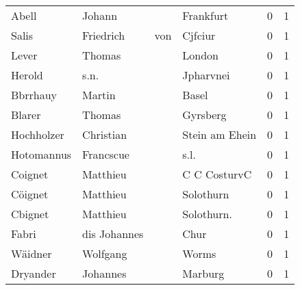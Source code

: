 \documentclass[10pt,a4paper,landscape]{article}
\begin{document}
\begin{longtable}{llllrr}
                    Abell &                             Johann &             &                                   Frankfurt &          0 &         1 \\
                    Salis &                          Friedrich &         von &                                     Cjfciur &          0 &         1 \\
                    Lever &                             Thomas &             &                                      London &          0 &         1 \\
                   Herold &                               s.n. &             &                                   Jpharvnei &          0 &         1 \\
                 Bbrrhauy &                             Martin &             &                                       Basel &          0 &         1 \\
                   Blarer &                             Thomas &             &                                    Gyrsberg &          0 &         1 \\
               Hochholzer &                          Christian &             &                              Stein am Ehein &          0 &         1 \\
               Hotomannus &                          Francscue &             &                                        s.l. &          0 &         1 \\
                  Coignet &                           Matthieu &             &                                C C CosturvC &          0 &         1 \\
                  Cöignet &                           Matthieu &             &                                   Solothurn &          0 &         1 \\
                  Cbignet &                           Matthieu &             &                                 Solothurn.  &          0 &         1 \\
                    Fabri &                       dis Johannes &             &                                        Chur &          0 &         1 \\
                  Wäidner &                           Wolfgang &             &                                       Worms &          0 &         1 \\
                 Dryander &                           Johannes &             &                                     Marburg &          0 &         1 \\

\end{longtable}
\end{document}
